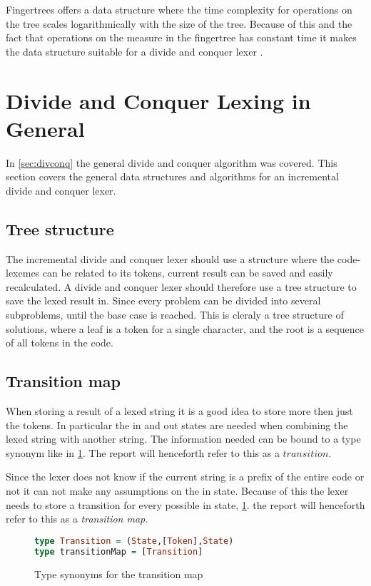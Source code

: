 \newpage

Fingertrees offers a data structure where the time complexity for operations on
the tree scales logarithmically with the size of the tree. Because of this and
the fact that operations on the measure in the fingertree has constant time it
makes the data structure suitable for a divide and conquer lexer
\cite{fingertree}.

\section{Divide and Conquer Lexing in General}
In \cref{sec:divconq} the general divide and conquer algorithm was covered. This
section covers the general data structures and algorithms for an incremental
divide and conquer lexer.

\subsection{Tree structure}
The incremental divide and conquer lexer should use a structure where the
code-lexemes can be related to its tokens, current result can be saved and
easily recalculated. A divide and conquer lexer should therefore use a tree
structure to save the lexed result in. Since every problem can be divided into
several subproblems, until the base case is reached. This is cleraly a tree
structure of solutions, where a leaf is a token for a single character, and the
root is a sequence of all tokens in the code.  

\subsection{Transition map}
When storing a result of a lexed string it is a good idea to store more then
just the tokens. In particular the in and out states are needed when combining
the lexed string with another string. The information needed can be bound to a
type synonym like in \cref{fig:transitionMap}. The report will henceforth refer
to this as a $transition$.

Since the lexer does not know if the current string is a prefix of the entire
code or not it can not make any assumptions on the in state. Because of this the
lexer needs to store a transition for every possible in state,
\cref{fig:transitionMap}. the report will henceforth refer to this as a
\emph{transition map}.

\begin{figure}[h!]
\begin{lstlisting}[language=Haskell]
type Transition = (State,[Token],State)
type transitionMap = [Transition]
\end{lstlisting}
\caption{Type synonyms for the transition map \label{fig:transitionMap}}
\end{figure}

